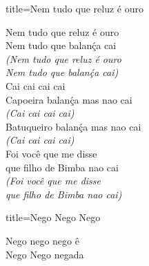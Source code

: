 \documentclass[fontsize=14pt, paper=a4, twoside, DIV=20]{scrreprt} %
\begin{document}
\begin{multicols*}{2}
\begin{song}{title={Nem tudo que reluz é ouro}}
        \begin{verse*}
            Nem tudo que reluz é ouro\\
            Nem tudo que balanḉa cai\\
            \textit{(Nem tudo que reluz é ouro}\\
            \textit{Nem tudo que balanḉa cai)}\\
            Cai cai cai cai\\
            Capoeira balanḉa mas nao cai\\
            \textit{(Cai cai cai cai)}\\
            Batuqueiro balanḉa mas nao cai\\
            \textit{(Cai cai cai cai)}\\
            Foi você que me disse\\
            que filho de Bimba nao cai\\
            \textit{(Foi você que me disse}\\
            \textit{que filho de Bimba nao cai)}\\
        \end{verse*}
\end{song}


\columnbreak
\begin{song}{title={Nego Nego Nego}}
        \begin{verse*}
                Nego nego nego ê\\
                Nego Nego negada
        \end{verse*}
\end{song}


\end{multicols*}
\end{document}
